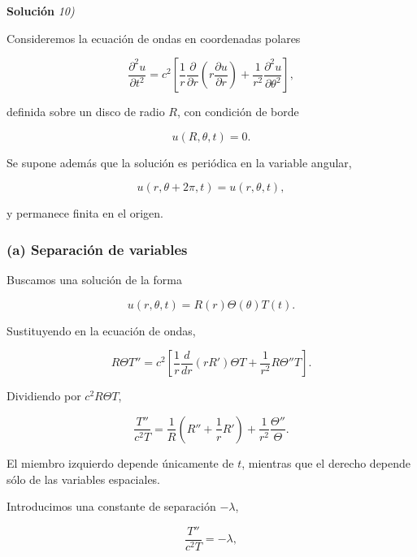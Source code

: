\documentclass[12pt]{article}
\begin{document}
\vspace{0.5cm}
{\bf Soluci\'on }{\em 10)}
\vspace{0.5cm}

Consideremos la ecuación de ondas en coordenadas polares

\begin{equation}
\frac{\partial^2u}{\partial t^2}
=
c^2
\left[
\frac{1}{r}\frac{\partial}{\partial r}
\left(
r\frac{\partial u}{\partial r}
\right)
+
\frac{1}{r^2}
\frac{\partial^2u}{\partial\theta^2}
\right],
\end{equation}

definida sobre un disco de radio $R$, con condición de borde

\begin{equation}
u(R,\theta,t)=0.
\end{equation}

Se supone además que la solución es periódica en la variable angular,

\[
u(r,\theta+2\pi,t)=u(r,\theta,t),
\]

y permanece finita en el origen.

\subsubsection*{(a) Separación de variables}

Buscamos una solución de la forma

\begin{equation}
u(r,\theta,t)=R(r)\Theta(\theta)T(t).
\end{equation}

Sustituyendo en la ecuación de ondas,

\[
R\Theta T''
=
c^2
\left[
\frac1r
\frac{d}{dr}
\left(
rR'
\right)
\Theta T
+
\frac1{r^2}
R\Theta''T
\right].
\]

Dividiendo por $c^2R\Theta T$,

\begin{equation}
\frac{T''}{c^2T}
=
\frac1R
\left(
R''+\frac1rR'
\right)
+
\frac1{r^2}
\frac{\Theta''}{\Theta}.
\end{equation}

El miembro izquierdo depende únicamente de $t$, mientras que el derecho depende sólo de las variables espaciales.

Introducimos una constante de separación $-\lambda$,

\begin{equation}
\frac{T''}{c^2T}
=
-\lambda,
\end{equation}
\end{document}
